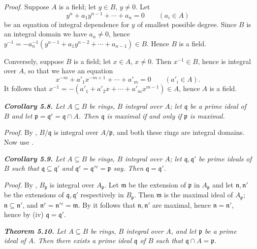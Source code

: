 \noindent\emph{Proof.}  Suppose $A$ is a field; let $y\in B$, $y\ne0$.  Let
\[
y^n+a_1y^{n-1}+\cdots+a_n=0\qquad(a_i\in A)
\]
be an equation of integral dependence for $y$ of smallest possible degree.  Since $B$
is an integral domain we have $a_n\ne0$, hence $y^{-1}=-a_n^{-1}(y^{n-1}+a_1y^{n-2}+\cdots
+a_{n-1})\in B$.  Hence $B$ is a field.

Conversely, suppose $B$ is a field; let $x\in A$, $x\ne0$.  Then $x^{-1}\in B$, hence is
integral over $A$, so that we have an equation
\[
x^{-m}+a'_1x^{-m+1}+\cdots+a'_m=0\qquad(a'_i\in A).
\]
It follows that $x^{-1}=-(a'_1+a'_2x+\cdots+a'_mx^{m-1})\in A$, hence $A$ is a field.\proofbox

\medskip
\noindent\textit{\textbf{Corollary 5.8.} Let $A\subseteq B$ be rings, $B$ integral over $A$; let $\mathfrak q$ be a prime ideal
of $B$ and let $\mathfrak p=\mathfrak q^c=\mathfrak q\cap A$.  Then $\mathfrak q$ is maximal if and only if $\mathfrak p$ is maximal.}

\noindent\emph{Proof.}  By , $B/\mathfrak q$ is integral over $A/\mathfrak p$, and both these rings are integral
domains.  Now use .\proofbox

\medskip
\noindent\textit{\textbf{Corollary 5.9.} Let $A\subseteq B$ be rings, $B$ integral over $A$; let $\mathfrak q,\mathfrak q'$ be prime
ideals of $B$ such that $\mathfrak q\subseteq\mathfrak q'$ and $\mathfrak q^c=\mathfrak q'{}^c=\mathfrak p$ say.  Then $\mathfrak q=\mathfrak q'$.}

\noindent\emph{Proof.}  By , $B_\mathfrak p$ is integral over $A_\mathfrak p$.  Let $\mathfrak m$ be the extension of $\mathfrak p$ in $A_\mathfrak p$ and let
$\mathfrak n,\mathfrak n'$ be the extensions of $\mathfrak q,\mathfrak q'$ respectively in $B_\mathfrak p$.  Then $\mathfrak m$ is the maximal ideal
of $A_\mathfrak p$; $\mathfrak n\subseteq\mathfrak n'$, and $\mathfrak n^c=\mathfrak n'{}^c=\mathfrak m$.  By  it follows that $\mathfrak n,\mathfrak n'$ are maximal,
hence $\mathfrak n=\mathfrak n'$, hence by (iv) $\mathfrak q=\mathfrak q'$.\proofbox

\medskip
\noindent\textit{\textbf{Theorem 5.10.} Let $A\subseteq B$ be rings, $B$ integral over $A$, and let $\mathfrak p$ be a prime
ideal of $A$.  Then there exists a prime ideal $\mathfrak q$ of $B$ such that $\mathfrak q\cap A=\mathfrak p$.}

